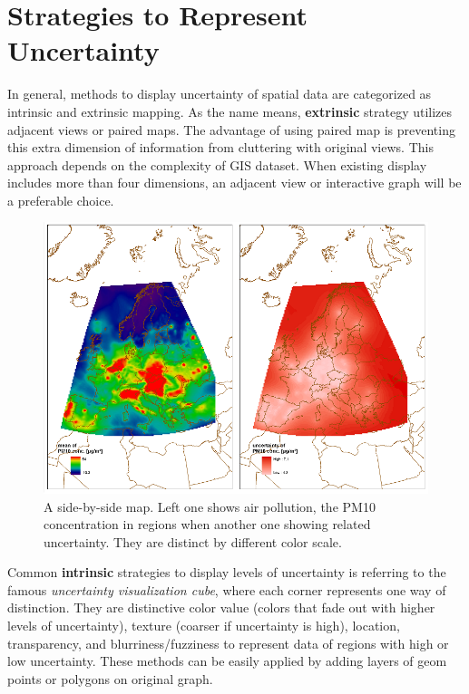 \documentclass[11pt,letterpaper]{article}
\begin{document}
\section*{Strategies to Represent Uncertainty}
\noindent In general, methods to display uncertainty of spatial data are categorized as intrinsic and extrinsic mapping. As the name means, \textbf{extrinsic} strategy utilizes adjacent views or paired maps. The advantage of using paired map is preventing this extra dimension of information from cluttering with original views. This approach depends on the complexity of GIS dataset. When existing display includes more than four dimensions, an adjacent view or interactive graph will be a preferable choice. 

\begin{figure}
\includegraphics[scale=0.6]{memo_fig2.png}
\caption{A side-by-side map. Left one shows air pollution, the PM10 concentration in regions when another one showing related uncertainty. They are distinct by different color scale.}
\end{figure}

\noindent Common \textbf{intrinsic} strategies to display levels of uncertainty is referring to the famous \textit{uncertainty visualization cube}, where each corner represents one way of distinction. They are distinctive color value (colors that fade out with higher levels of uncertainty), texture (coarser if uncertainty is high), location, transparency, and blurriness/fuzziness to represent data of regions with high or low uncertainty. These methods can be easily applied by adding layers of geom points or polygons on original graph.
\end{document}
